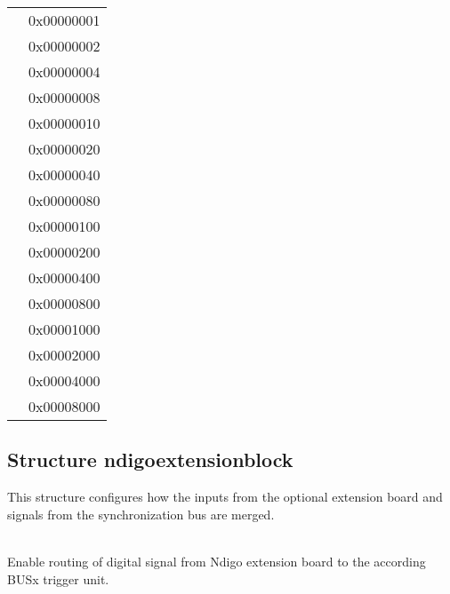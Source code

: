             \begin{xltabular}{\textwidth}{lX}
                 & 0x00000001\\
                 & 0x00000002\\
                 & 0x00000004\\
                 & 0x00000008\\
                 & 0x00000010\\
                 & 0x00000020\\
                 & 0x00000040\\
                 & 0x00000080\\
                 & 0x00000100\\
                 & 0x00000200\\
                 & 0x00000400\\
                 & 0x00000800\\
                 & 0x00001000\\
                 & 0x00002000\\
                 & 0x00004000\\
                 & 0x00008000
            \end{xltabular}

        \subsection{Structure ndigo\tu extension\tu block}
            This structure configures how the inputs from the optional extension board and signals from the synchronization bus are merged.\par

            \\
            Enable routing of digital signal from Ndigo extension board to the according BUSx trigger unit.\par

